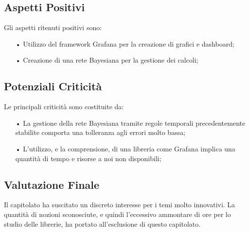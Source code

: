 \subsection{Aspetti Positivi}

Gli aspetti ritenuti positivi sono: 
\begin{itemize}

\item[•] Utilizzo del framework Grafana per la creazione di grafici e dashboard;
\item[•] Creazione di una rete Bayesiana per la gestione dei calcoli;

\end{itemize}

\subsection{Potenziali Criticità}
Le principali criticità sono costituite da: 
\begin{itemize}

\item[•]La gestione della rete Bayesiana tramite regole temporali precedentemente stabilite comporta una tolleranza agli errori molto bassa;

\item[•] L'utilizzo, e la comprensione, di una libreria come Grafana implica una quantità di tempo e risorse a noi non disponibili;

\end{itemize}


\subsection{Valutazione Finale}
Il capitolato ha suscitato un discreto interesse per i temi molto innovativi. 
La quantità di nozioni sconosciute, e quindi l'eccessivo ammontare di ore per lo studio delle librerie, ha portato all'esclusione di questo capitolato. 